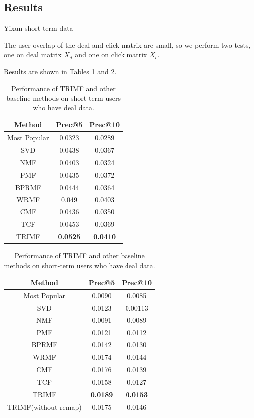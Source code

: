 \subsection{Results}
  \begin{subsubsection}{Yixun short term data}
\par{The user overlap of the deal and click matrix are small, so we perform two tests, one on deal matrix $X_d$ and one on click matrix $X_c$.}
\par{Results are shown in Tables \ref{shortdeal} and \ref{shortclick}.}
\begin{table}


\begin{center}
  \begin{tabular}{|c|c|c|}
    \hline
    Method&Prec@5&Prec@10\\
    \hline
    Most Popular&0.0323&0.0289\\
    \hline
    SVD&0.0438&0.0367\\
    \hline
    NMF&0.0403&0.0324\\
    \hline
    PMF&0.0435&0.0372\\
    \hline
    BPRMF&0.0444&0.0364\\
    \hline
    WRMF&0.049&0.0403\\
    \hline
    CMF&0.0436&0.0350\\
    \hline
    TCF&0.0453&0.0369\\
    \hline
    TRIMF&\textbf{\color{red}0.0525}&\textbf{\color{red}0.0410}\\
    \hline
  \end{tabular}
\end{center}
\caption{Performance of TRIMF and other baseline methods on short-term users who have deal data.}
\label{shortdeal}

\end{table}

\begin{table}

  \centering


  \begin{tabular}{|c|c|c|}
    \hline
    Method&Prec@5&Prec@10\\
    \hline
    Most Popular&0.0090&0.0085\\
    \hline
    SVD&0.0123&0.00113\\
    \hline
    NMF&0.0091&0.0089\\
    \hline
    PMF&0.0121&0.0112\\
    \hline
    BPRMF&0.0142&0.0130\\
    \hline
    WRMF&0.0174&0.0144\\
    \hline
    CMF&0.0176&0.0139\\
    \hline
    TCF&0.0158&0.0127\\
    \hline
    TRIMF&\textbf{\color{red}0.0189}&\textbf{\color{red}0.0153}\\
    \hline
    TRIMF(without remap)&0.0175&0.0146\\
    \hline
  \end{tabular}
\caption{Performance of TRIMF and other baseline methods on short-term users who have deal data.}
  \label{shortclick}
  

\end{table}
\end{subsubsection}
